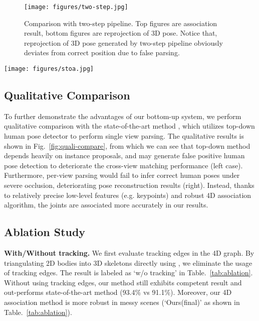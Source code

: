 \documentclass[10pt,twocolumn,letterpaper]{article}
\begin{document}
\begin{figure}[ht!]
  \centering
  \texttt{[image: figures/two-step.jpg]}
\caption{Comparison with two-step pipeline. Top figures are association result, bottom figures are reprojection of 3D pose. Notice that, reprojection of 3D pose generated by two-step pipeline obviously
  deviates from correct position due to false parsing.}\label{fig:two-step}
      \vspace{-3mm}
\end{figure}

\begin{figure*}[ht!]
    \centering
    \texttt{[image: figures/stoa.jpg]}
\caption{Qualitative comparison with Dong\cite{dong2019fast} on Shelf (left figure) and our captured data (right figure), both with 5 cameras. For each case, we show association results and reprojection of 3D pose on two sample views. For 3D visualization, we show a side view rendering and a top view rendering for clear comparison. }
    \label{fig:quali-compare}
        \vspace{-3mm}
\end{figure*}

\subsection{Qualitative Comparison}
\label{sec:sec:qualitative}
To further demonstrate the advantages of our bottom-up system, we perform qualitative comparison with the state-of-the-art method \cite{dong2019fast}, which utilizes top-down human pose detector \cite{Chen2018CPN} to perform single view parsing. The qualitative results is shown in Fig.~\ref{fig:quali-compare}, from which we can see that top-down method depends heavily on instance proposals, and may generate false positive human pose detection to deteriorate the cross-view matching performance (left case). Furthermore, per-view parsing would fail to infer correct human poses under severe occlusion, deteriorating pose reconstruction results (right). Instead, thanks to relatively precise low-level features (e.g. keypoints) and robust 4D association algorithm, the joints are associated more accurately in our results.

\subsection{Ablation Study}
\label{sec:sec:ablation}
\noindent\textbf{With/Without tracking. }
We first evaluate tracking edges in the 4D graph. By triangulating 2D bodies into 3D skeletons directly using , we eliminate the usage of tracking edges. The result is labeled as `w/o tracking' in Table.~\ref{tab:ablation}.
Without using tracking edges, our method still exhibits competent result and out-performs state-of-the-art method \cite{dong2019fast} (93.4\% vs 91.1\%). Moreover, our 4D association method is more robust in messy scenes (`Ours(final)' as shown in Table.~\ref{tab:ablation}).
\end{document}
